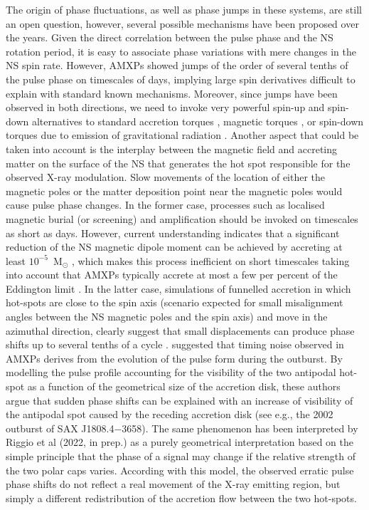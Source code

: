 \documentclass[fleqn,usenatbib]{mnras}
\begin{document}
The origin of phase fluctuations, as well as phase jumps in these systems, are still an open question, however, several possible mechanisms have been proposed over the years. Given the direct correlation between the pulse phase and the NS rotation period, it is easy to associate phase variations with mere changes in the NS spin rate. However, AMXPs showed jumps of the order of several tenths of the pulse phase on timescales of days, implying large spin derivatives difficult to explain with standard known mechanisms. Moreover, since jumps have been observed in both directions, we need to invoke very powerful spin-up and spin-down alternatives to standard accretion torques \citep[see e.g.,][]{Lamb:1978uf,Ghosh:1979ws}, magnetic torques \citep[see e.g.,][]{Wang95,Rappaport:2004tr,Kluzniak07}, or spin-down torques due to emission of gravitational radiation \citep[see e.g.,][]{Bildsten:1998wb}.
Another aspect that could be taken into account is the interplay between the magnetic field and accreting matter on the surface of the NS that generates the hot spot responsible for the observed X-ray modulation. Slow movements of the location of either the magnetic poles or the matter deposition point near the magnetic poles would cause pulse phase changes. In the former case, processes such as localised magnetic burial (or screening) and amplification should be invoked on timescales as short as days. However, current understanding indicates that a significant reduction of the NS magnetic dipole moment can be achieved by accreting at least $10^{-5}$~M$_\odot$ \citep{Payne:2004wj}, which makes this process inefficient on short timescales taking into account that AMXPs typically accrete at most a few per percent of the Eddington limit \citep[see e.g.,][]{Di-Salvo:2020va,Patruno:2021vs}. In the latter case, simulations of funnelled accretion in which hot-spots are close to the spin axis (scenario expected for small misalignment angles between the NS magnetic poles and the spin axis) and move in the azimuthal direction, clearly suggest that small displacements can produce phase shifts up to several tenths of a cycle \citep[see e.g.,][and references therein]{Lamb:2009wf}.     
\citet{Poutanen:2009wb} suggested that timing noise observed in AMXPs derives from the evolution of the pulse form during the outburst. By modelling the pulse profile accounting for the visibility of the two antipodal hot-spot as a function of the geometrical size of the accretion disk, these authors argue that sudden phase shifts can be explained with an increase of visibility of the antipodal spot caused by the receding accretion disk (see e.g., the 2002 outburst of SAX J1808.4$-$3658). The same phenomenon has been interpreted by Riggio et al (2022, in prep.) as a purely geometrical interpretation based on the simple principle that the phase of a signal may change if the relative strength of the two polar caps varies. According with this model, the observed erratic pulse phase shifts do not reflect a real movement of the X-ray emitting region, but simply a different redistribution of the accretion flow between the two hot-spots.
\end{document}
